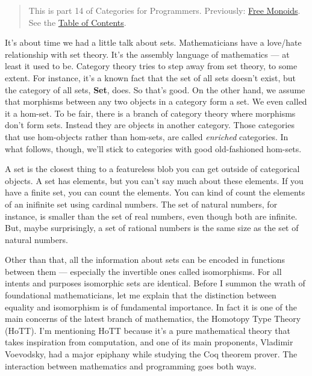 \begin{quote}
This is part 14 of Categories for Programmers. Previously:
\href{https://bartoszmilewski.com/2015/07/21/free-monoids/}{Free
Monoids}. See the
\href{https://bartoszmilewski.com/2014/10/28/category-theory-for-programmers-the-preface/}{Table
of Contents}.
\end{quote}

It's about time we had a little talk about sets. Mathematicians have a
love/hate relationship with set theory. It's the assembly language of
mathematics --- at least it used to be. Category theory tries to step
away from set theory, to some extent. For instance, it's a known fact
that the set of all sets doesn't exist, but the category of all sets,
\textbf{Set}, does. So that's good. On the other hand, we assume that
morphisms between any two objects in a category form a set. We even
called it a hom-set. To be fair, there is a branch of category theory
where morphisms don't form sets. Instead they are objects in another
category. Those categories that use hom-objects rather than hom-sets,
are called \emph{enriched} categories. In what follows, though, we'll
stick to categories with good old-fashioned hom-sets.

A set is the closest thing to a featureless blob you can get outside of
categorical objects. A set has elements, but you can't say much about
these elements. If you have a finite set, you can count the elements.
You can kind of count the elements of an inifinite set using cardinal
numbers. The set of natural numbers, for instance, is smaller than the
set of real numbers, even though both are infinite. But, maybe
surprisingly, a set of rational numbers is the same size as the set of
natural numbers.

Other than that, all the information about sets can be encoded in
functions between them --- especially the invertible ones called
isomorphisms. For all intents and purposes isomorphic sets are
identical. Before I summon the wrath of foundational mathematicians, let
me explain that the distinction between equality and isomorphism is of
fundamental importance. In fact it is one of the main concerns of the
latest branch of mathematics, the Homotopy Type Theory (HoTT). I'm
mentioning HoTT because it's a pure mathematical theory that takes
inspiration from computation, and one of its main proponents, Vladimir
Voevodsky, had a major epiphany while studying the Coq theorem prover.
The interaction between mathematics and programming goes both ways.

